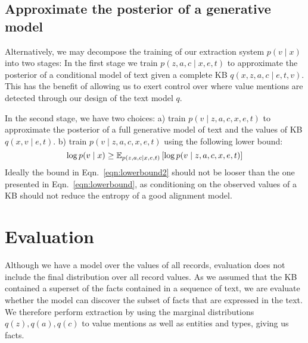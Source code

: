\documentclass[12pt]{article}
\begin{document}
\subsection{Approximate the posterior of a generative model}
Alternatively, we may decompose the training of our extraction system $p(v\mid x)$ into two stages:
In the first stage we train $p(z,a,c\mid x,e,t)$ to approximate the posterior
of a conditional model of text given a complete KB $q(x,z,a,c \mid e,t,v)$.
This has the benefit of allowing us to exert control over where value mentions are detected
through our design of the text model $q$.

In the second stage, we have two choices:
a) train $p(v \mid z,a,c,x,e,t)$ to approximate the posterior of a full generative model of text and
the values of KB $q(x,v\mid e,t)$.
b) train $p(v \mid z,a,c,x,e,t)$ using the following lower bound:
\begin{equation}
\label{eqn:lowerbound2}
\log p(v\mid x) \geq
\mathbb{E}_{p(z,a,c\mid x,e,t)}\left[\log p(v\mid z,a,c, x,e,t)\right]
\end{equation}
Ideally the bound in Eqn.~\ref{eqn:lowerbound2}
should not be looser than the one presented in Eqn.~\ref{eqn:lowerbound},
as conditioning on the observed values of a KB should not reduce the entropy of
a good alignment model.

\section{Evaluation}
Although we have a model over the values of all records,
evaluation does not include the final distribution over all record values.
As we assumed that the KB contained a superset of the facts contained in
a sequence of text, we are evaluate whether the model can discover the subset of facts that 
are expressed in the text.
We therefore perform extraction by using the marginal distributions
$q(z),q(a),q(c)$ to value mentions as well as entities and types,
giving us facts.
\end{document}
